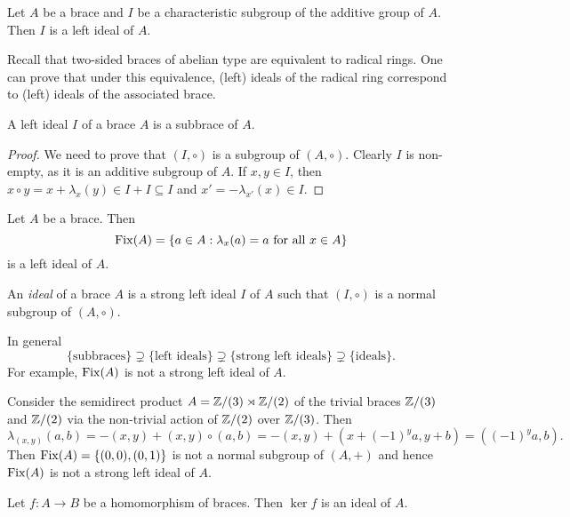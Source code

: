 \begin{example}
    Let $A$ be a brace and $I$ be a characteristic subgroup 
    of the additive group of $A$. Then 
    $I$ is a left ideal of $A$. 
\end{example}

Recall that two-sided braces of abelian type 
are equivalent to radical rings. 
One can prove that under this equivalence, 
(left) ideals of the radical ring correspond 
to (left) ideals of the associated brace. 

\begin{proposition}
    A left ideal $I$ of a brace $A$ is a subbrace of $A$. 
\end{proposition}

\begin{proof}
    We need to prove that $(I,\circ)$ is a subgroup of $(A,\circ)$. Clearly $I$ is non-empty, 
    as it is an additive subgroup of $A$. If $x,y\in I$, then
    $x\circ y=x+\lambda_x(y)\in I+I\subseteq I$ and $x'=-\lambda_{x'}(x)\in I$. 
\end{proof}

\begin{example}
    Let $A$ be a brace. Then 
    \[
    \operatorname{Fix}(A)=\{a\in A:\lambda_x(a)=a\text{ for all $x\in A$}\}
    \]
    is a left ideal of $A$. 
\end{example}

\begin{definition}
    An \emph{ideal} of a brace $A$ is a strong left ideal $I$ of $A$ such that 
	$(I,\circ)$ is a normal subgroup of $(A,\circ)$. 
\end{definition}

In general 
\[
\{\text{subbraces}\}\supsetneq \{\text{left ideals}\}\supsetneq\{\text{strong left ideals}\}\supsetneq\{\text{ideals}\}.
\]
For example, $\operatorname{Fix}(A)$ is not a strong left ideal of $A$.

\begin{example}
    Consider the semidirect product $A=\mathbb{Z}/(3)\rtimes \mathbb{Z}/(2)$ of the
    trivial braces $\mathbb{Z}/(3)$ and $\mathbb{Z}/(2)$
    via the non-trivial action of $\mathbb{Z}/(2)$ over $\mathbb{Z}/(3)$.
    Then 
    \[
    \lambda_{(x,y)}(a,b)=-(x,y)+(x,y)\circ(a,b)=-(x,y)+(x+(-1)^ya,y+b)=((-1)^ya,b).
    \]
    Then $\operatorname{Fix}(A)=\{(0,0),(0,1)\}$ is not a 
    normal subgroup of $(A,+)$ and hence $\operatorname{Fix}(A)$ is not a strong left 
    ideal of $A$.
\end{example}

\begin{example}
	Let $f\colon A\to B$ be a homomorphism of braces. Then $\ker f$ 
	is an ideal of $A$.
\end{example}

